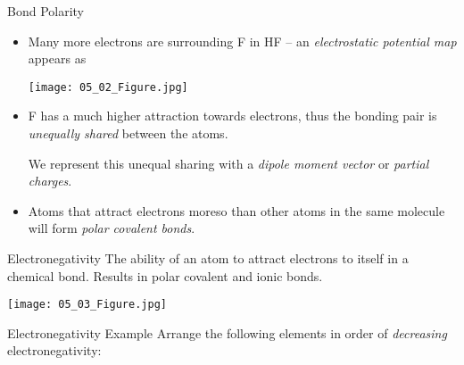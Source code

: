 \documentclass[notes=hide]{beamer}
\begin{document}
\begin{frame}{Bond Polarity}
	\begin{itemize}[<+->]
		\item Many more electrons are surrounding F in HF -- an
			\emph{electrostatic potential map} appears as
			\begin{center}
				\texttt{[image: 05\_02\_Figure.jpg]}
			\end{center}
		\item F has a much higher attraction towards electrons, thus the
			bonding pair is \emph{unequally shared} between the
			atoms.

			\medskip

			\begin{center}
			\end{center}

			\medskip

			We represent this unequal sharing with a \emph{dipole
			moment vector} or \emph{partial charges}.
		\item Atoms that attract electrons moreso than other atoms in
			the same molecule will form \emph{polar covalent bonds}.
	\end{itemize}
\end{frame}

\begin{frame}
	\begin{block}{Electronegativity}
		The ability of an atom to attract electrons to itself in a
		chemical bond. Results in polar covalent and ionic bonds.
	\end{block}

	\begin{center}
		\texttt{[image: 05\_03\_Figure.jpg]}
	\end{center}
\end{frame}

\begin{frame}[t]{Electronegativity Example}
	Arrange the following elements in order of \emph{decreasing}
	electronegativity:

	\begin{center}
		 \qquad {} 
	\end{center}


\end{frame}
\end{document}
